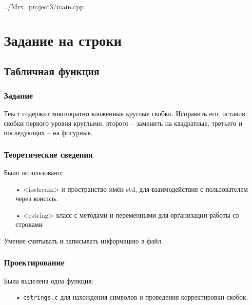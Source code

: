 \documentclass[12pt,a4paper]{report}
\begin{document}

{../Mrx_project3/main.cpp}


\chapter{Задание на строки}

\section{Табличная функция}

\subsection{Задание}

Текст содержит многократно вложенные круглые скобки. Исправить его, оставив скобки первого уровня круглыми, второго – заменить на квадратные, третьего и последующих – на фигурные.

\subsection{Теоретические сведения}

Было использовано:
\begin{enumerate}
\item[•] <iostream> и пространство имён std, для взаимодействия с пользователем через консоль.
\item[•] <cstring> класс с методами и переменными для организации работы со строками
\end{enumerate}


Умение считывать и записывать информацию в файл.

\subsection{Проектирование}

Была выделена одна функция:
\begin{enumerate}
\item[•] \verb-сstrings.c- для нахождения символов и проведения корректировки скобок.
\end{enumerate}
\end{document}
